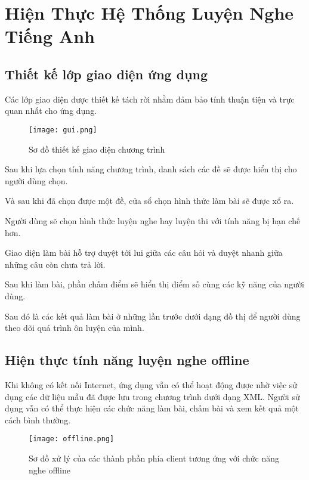 \chapter{Hiện Thực Hệ Thống Luyện Nghe Tiếng Anh}

\ifpdf
    \graphicspath{{Chapter4/Chapter4Figs/PNG/}{Chapter4/Chapter4Figs/PDF/}{Chapter4/Chapter4Figs/}}
\else
    \graphicspath{{Chapter4/Chapter4Figs/EPS/}{Chapter4/Chapter4Figs/}}
\fi

\section{Thiết kế lớp giao diện ứng dụng}

Các lớp giao diện được thiết kế tách rời nhằm đảm bảo tính thuận tiện và trực quan nhất cho ứng dụng.

\begin{figure}[!htb] 
\centering
\texttt{[image: gui.png]}
\caption{Sơ đồ thiết kế giao diện chương trình}
\end{figure}

Sau khi lựa chọn tính năng chương trình, danh sách các đề sẽ được hiển thị cho người dùng chọn. 

Và sau khi đã chọn được một đề, cửa sổ chọn hình thức làm bài sẽ được xổ ra. 

Người dùng sẽ chọn hình thức luyện nghe hay luyện thi với tính năng bị hạn chế hơn. 

Giao diện làm bài hỗ trợ duyệt tới lui giữa các câu hỏi và duyệt nhanh giữa những câu còn chưa trả lời. 

Sau khi làm bài, phần chấm điểm sẽ hiển thị điểm số cùng các kỹ năng của người dùng. 

Sau đó là các kết quả làm bài ở những lần trước dưới dạng đồ thị để người dùng theo dõi quá trình ôn luyện của mình.

\section{Hiện thực tính năng luyện nghe offline}

Khi không có kết nối Internet, ứng dụng vẫn có thể hoạt động được nhờ việc sử dụng các dữ liệu mẫu đã được lưu trong chương trình dưới dạng XML. Người sử dụng vẫn có thể thực hiện các chức năng làm bài, chấm bài và xem kết quả một cách bình thường.

\begin{figure}[!htb] 
\centering
\texttt{[image: offline.png]}
\caption{Sơ đồ xử lý của các thành phần phía client tương ứng với chức năng nghe offline}
\end{figure}

